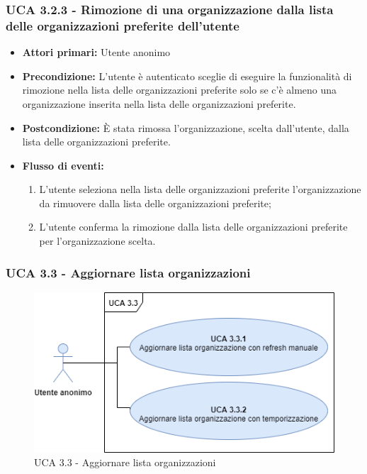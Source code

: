 \subsubsection{UCA 3.2.3 - Rimozione di una organizzazione dalla lista delle organizzazioni preferite dell'utente}%
\begin{itemize}
	\item \textbf{Attori primari:} Utente anonimo
	\item \textbf{Precondizione:}  L'utente è autenticato sceglie di eseguire la funzionalità di rimozione nella lista delle organizzazioni preferite solo se c'è almeno una organizzazione inserita nella lista delle organizzazioni preferite.
	\item \textbf{Postcondizione:} È stata rimossa l'organizzazione, scelta dall'utente, dalla lista delle organizzazioni preferite.
	\item \textbf{Flusso di eventi:}
	\begin{enumerate}
		\item L'utente seleziona nella lista delle organizzazioni preferite l'organizzazione da rimuovere dalla lista delle organizzazioni preferite;
		\item L'utente conferma la rimozione dalla lista delle organizzazioni preferite per l'organizzazione scelta.
	\end{enumerate}
\end{itemize}

\subsubsection{UCA 3.3 - Aggiornare lista organizzazioni}%

\begin{figure}[h]
	\centering
	\includegraphics[scale=0.5, center]{Sezioni/UseCase/Immagini/UCA3.3.png}
	\caption{UCA 3.3 - Aggiornare lista organizzazioni}
\end{figure}

